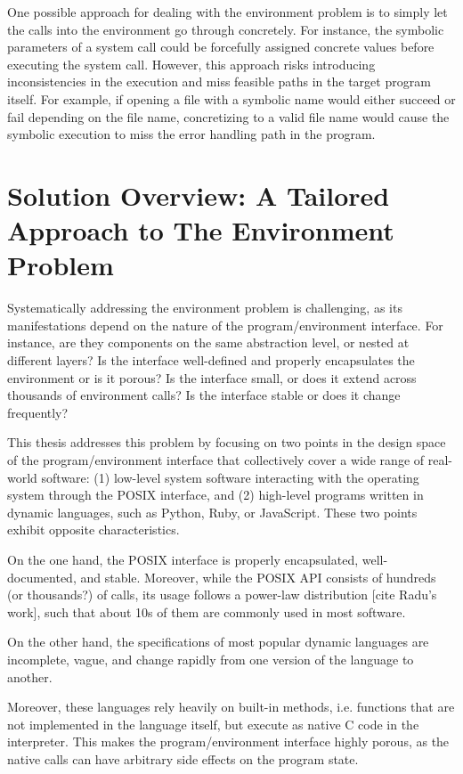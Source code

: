 One possible approach for dealing with the environment problem is to simply let the calls into the environment go through concretely.  For instance, the symbolic parameters of a system call could be forcefully assigned concrete values before executing the system call.
%
However, this approach risks introducing inconsistencies in the execution and miss feasible paths in the target program itself.
%
For example, if opening a file with a symbolic name would either succeed or fail depending on the file name, concretizing to a valid file name would cause the symbolic execution to miss the error handling path in the program.



\section{Solution Overview: A Tailored Approach to The Environment Problem}

Systematically addressing the environment problem is challenging, as its manifestations depend on the nature of the program/environment interface.  For instance, are they components on the same abstraction level, or nested at different layers?  Is the interface well-defined and properly encapsulates the environment or is it porous?  Is the interface small, or does it extend across thousands of environment calls?  Is the interface stable or does it change frequently?

This thesis addresses this problem by focusing on two points in the design space of the program/environment interface that collectively cover a wide range of real-world software: (1) low-level system software interacting with the operating system through the POSIX interface, and (2) high-level programs written in dynamic languages, such as Python, Ruby, or JavaScript.  These two points exhibit opposite characteristics.

On the one hand, the POSIX interface is properly encapsulated, well-documented, and stable.  Moreover, while the POSIX API consists of hundreds (or thousands?) of calls, its usage follows a power-law distribution [cite Radu's work], such that about 10s of them are commonly used in most software.

On the other hand, the specifications of most popular dynamic languages are incomplete, vague, and change rapidly from one version of the language to another.

Moreover, these languages rely heavily on built-in methods, i.e. functions that are not implemented in the language itself, but execute as native C code in the interpreter.  This makes the program/environment interface highly porous, as the native calls can have arbitrary side effects on the program state.

